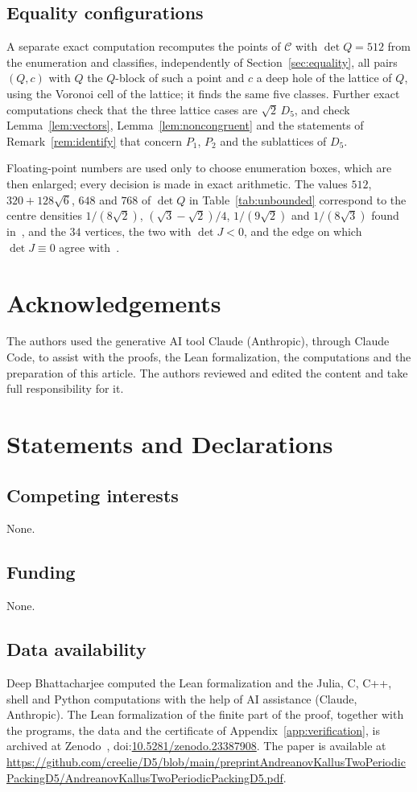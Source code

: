 \documentclass[11pt]{amsart}
\theoremstyle{definition}
\theoremstyle{remark}
\numberwithin{equation}{section}
\numberwithin{table}{section}
\numberwithin{figure}{section}
\newcommand{\cand}{\mathcal{C}}
\newcommand{\zenodoID}{10.5281/zenodo.23387908}
\newcommand{\preprintURL}{https://github.com/creelie/D5/blob/main/preprintAndreanovKallusTwoPeriodicPackingD5/AndreanovKallusTwoPeriodicPackingD5.pdf}
\begin{document}
\subsection*{Equality configurations}
A separate exact computation recomputes the points of $\cand$ with $\det Q=512$ from the enumeration and classifies, independently of Section~\ref{sec:equality}, all pairs $(Q,c)$ with $Q$ the $Q$-block of such a point and $c$ a deep hole of the lattice of $Q$, using the Voronoi cell of the lattice; it finds the same five classes. Further exact computations check that the three lattice cases are $\sqrt2\,D_5$, and check Lemma~\ref{lem:vectors}, Lemma~\ref{lem:noncongruent} and the statements of Remark~\ref{rem:identify} that concern $P_1$, $P_2$ and the sublattices of $D_5$.

Floating-point numbers are used only to choose enumeration boxes, which are then enlarged; every decision is made in exact arithmetic. The values $512$, $320+128\sqrt6$, $648$ and $768$ of $\det Q$ in Table~\ref{tab:unbounded} correspond to the centre densities $1/(8\sqrt2)$, $(\sqrt3-\sqrt2)/4$, $1/(9\sqrt2)$ and $1/(8\sqrt3)$ found in~\cite[\S4.3]{AK2020}, and the $34$ vertices, the two with $\det J<0$, and the edge on which $\det J\equiv0$ agree with~\cite[\S4.3]{AK2020}.

\section*{Acknowledgements}

The authors used the generative AI tool Claude (Anthropic), through Claude Code, to assist with the proofs, the Lean formalization, the computations and the preparation of this article. The authors reviewed and edited the content and take full responsibility for it.

\section*{Statements and Declarations}

\subsection*{Competing interests} None.

\subsection*{Funding} None.

\subsection*{Data availability} {\raggedright Deep Bhattacharjee computed the Lean formalization and the Julia, C, C++, shell and Python computations with the help of AI assistance (Claude, Anthropic). The Lean formalization of the finite part of the proof, together with the programs, the data and the certificate of Appendix~\ref{app:verification}, is archived at Zenodo~\cite{D5archive}, doi:\href{https://doi.org/\zenodoID}{\zenodoID}. The paper is available at \url{\preprintURL}.\par}
\end{document}
